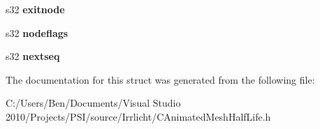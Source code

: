 \begin{DoxyCompactItemize}
\item 
\hypertarget{structirr_1_1scene_1_1_s_halflife_sequence_abc3283aaf94a61597705160269f4f612}{s32 {\bfseries exitnode}}\label{structirr_1_1scene_1_1_s_halflife_sequence_abc3283aaf94a61597705160269f4f612}

\item 
\hypertarget{structirr_1_1scene_1_1_s_halflife_sequence_a70169e8f9213ab63a00de8883dc72681}{s32 {\bfseries nodeflags}}\label{structirr_1_1scene_1_1_s_halflife_sequence_a70169e8f9213ab63a00de8883dc72681}

\item 
\hypertarget{structirr_1_1scene_1_1_s_halflife_sequence_a6f8d377c86db2c8f28738f79bab34fc1}{s32 {\bfseries nextseq}}\label{structirr_1_1scene_1_1_s_halflife_sequence_a6f8d377c86db2c8f28738f79bab34fc1}

\end{DoxyCompactItemize}


The documentation for this struct was generated from the following file\-:\begin{DoxyCompactItemize}
\item 
C\-:/\-Users/\-Ben/\-Documents/\-Visual Studio 2010/\-Projects/\-P\-S\-I/source/\-Irrlicht/C\-Animated\-Mesh\-Half\-Life.\-h\end{DoxyCompactItemize}
